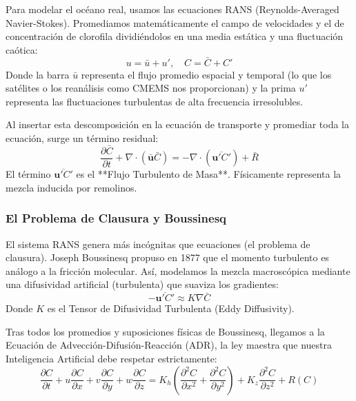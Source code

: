 \documentclass[11pt,a4paper]{article}
\begin{document}
Para modelar el océano real, usamos las ecuaciones RANS (Reynolds-Averaged Navier-Stokes). Promediamos matemáticamente el campo de velocidades y el de concentración de clorofila dividiéndolos en una media estática y una fluctuación caótica:
\begin{equation}
u = \bar{u} + u', \quad C = \bar{C} + C'
\end{equation}
Donde la barra $\bar{u}$ representa el flujo promedio espacial y temporal (lo que los satélites o los reanálisis como CMEMS nos proporcionan) y la prima $u'$ representa las fluctuaciones turbulentas de alta frecuencia irresolubles.

Al insertar esta descomposición en la ecuación de transporte y promediar toda la ecuación, surge un término residual:
\begin{equation}
\frac{\partial \bar{C}}{\partial t} + \nabla \cdot (\bar{\mathbf{u}}\bar{C}) = - \nabla \cdot (\overline{\mathbf{u}'C'}) + \bar{R}
\end{equation}
El término $\overline{\mathbf{u}'C'}$ es el **Flujo Turbulento de Masa**. Físicamente representa la mezcla inducida por remolinos.

\subsubsection{El Problema de Clausura y Boussinesq}
El sistema RANS genera más incógnitas que ecuaciones (el problema de clausura). Joseph Boussinesq propuso en 1877 que el momento turbulento es análogo a la fricción molecular. Así, modelamos la mezcla macroscópica mediante una difusividad artificial (turbulenta) que suaviza los gradientes:
\begin{equation}
- \overline{\mathbf{u}'C'} \approx K \nabla \bar{C}
\end{equation}
Donde $K$ es el Tensor de Difusividad Turbulenta (Eddy Diffusivity).

\begin{tcolorbox}[colback=blue!5!white,colframe=blue!75!black,title=La Ecuación ADR Gobernadora]
Tras todos los promedios y suposiciones físicas de Boussinesq, llegamos a la Ecuación de Advección-Difusión-Reacción (ADR), la ley maestra que nuestra Inteligencia Artificial debe respetar estrictamente:
\[ \frac{\partial C}{\partial t} + u\frac{\partial C}{\partial x} + v\frac{\partial C}{\partial y} + w\frac{\partial C}{\partial z} = K_h \left( \frac{\partial^2 C}{\partial x^2} + \frac{\partial^2 C}{\partial y^2} \right) + K_z \frac{\partial^2 C}{\partial z^2} + R(C) \]
\end{tcolorbox}
\end{document}
